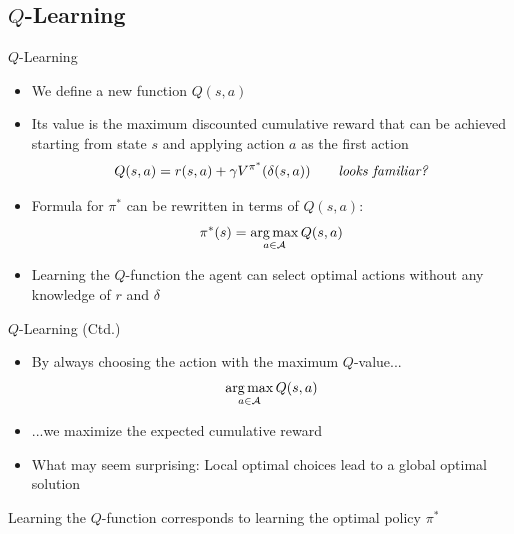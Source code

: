 \subsection{$Q$-Learning}

\begin{frame}{$Q$-Learning}{}
	\begin{itemize}
		\item We define a new function $Q(s, a)$
		\item Its value is the maximum discounted cumulative reward that can be achieved starting from state  $s$
			and applying action $a$ as the first action
		\begin{equation}
			Q(s, a) = r(s, a) + \gamma V^{\pi^*}(\delta(s, a)) \qquad \text{\textit{looks familiar?}}
		\end{equation}
		\item Formula for $\pi^*$ can be rewritten in terms of $Q(s, a)$:
		\begin{equation}
			\pi^*(s) = \operatorname*{arg\,max}_{a \in \mathcal{A}} Q(s, a)
		\end{equation}
		\item {} Learning the $Q$-function the agent can select optimal actions
			without any knowledge of $r$ and $\delta$
	\end{itemize}
\end{frame}


\begin{frame}{$Q$-Learning (Ctd.)}{}
	\begin{itemize}
		\item By always choosing the action with the maximum $Q$-value...
		\begin{equation*}
			\operatorname*{arg\,max}_{a \in \mathcal{A}} Q(s, a)
		\end{equation*}
		\item ...we maximize the expected cumulative reward
		\item What may seem surprising: Local optimal choices lead to a global optimal solution
	\end{itemize}

	\begin{boxBlueNoFrame}
		Learning the $Q$-function corresponds to learning the optimal policy $\pi^*$
	\end{boxBlueNoFrame}
\end{frame}


